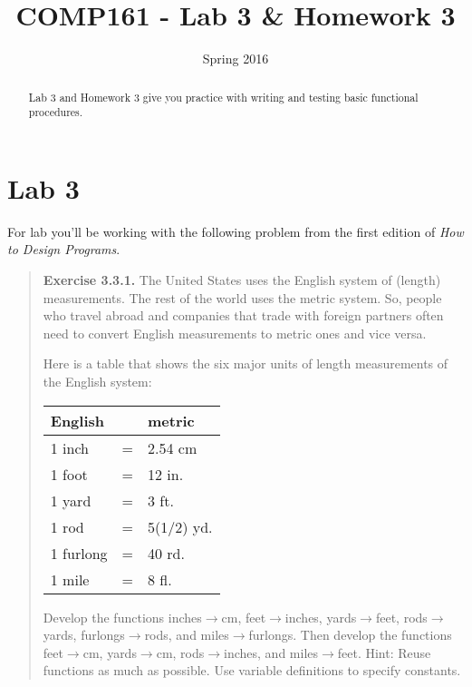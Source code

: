 \documentclass[]{tufte-handout}
\title{COMP161 - Lab 3 \& Homework 3}
\author{}
\date{Spring 2016}
\begin{document}
\maketitle

\begin{abstract}
Lab 3 and Homework 3 give you practice with writing and testing basic functional procedures.  
\end{abstract}

\section{Lab 3}

For lab you'll be working with the following problem from the first edition of \textit{How to Design Programs}.
\begin{framed}
\begin{quote}
\textbf{Exercise 3.3.1.}   The United States uses the English system of (length) measurements. The rest of the world uses the metric system. So, people who travel abroad and companies that trade with foreign partners often need to convert English measurements to metric ones and vice versa.

Here is a table that shows the six major units of length measurements of the English system:


\begin{center}
\begin{tabular}{lcl}
English & &  metric \\ \hline
1 inch	&=&	2.54	cm \\
1 foot	&=&	12	in. \\
1 yard	&=&	3	ft. \\
1 rod	&=&	5(1/2)	yd.\\
1 furlong	&=&	40	rd.\\
1 mile	&=&	8	fl.
\end{tabular}
\end{center}

Develop the functions inches$\rightarrow$cm, feet$\rightarrow$inches, yards$\rightarrow$feet, rods$\rightarrow$yards, furlongs$\rightarrow$rods, and miles$\rightarrow$furlongs.
Then develop the functions feet$\rightarrow$cm, yards$\rightarrow$cm, rods$\rightarrow$inches, and miles$\rightarrow$feet.
Hint: Reuse functions as much as possible. Use variable definitions to specify constants.
\end{quote}
\end{framed}
\end{document}
